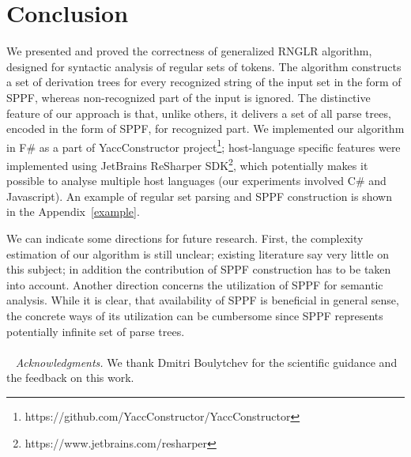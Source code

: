 \section{Conclusion}
%

We presented and proved the correctness of generalized RNGLR algorithm, designed for syntactic analysis of regular sets of
tokens. The algorithm constructs a set of derivation trees for every recognized string of the input set in the form of SPPF, 
whereas non-recognized part of the input is ignored. The distinctive feature of our approach is that, unlike others, it 
delivers a set of all parse trees, encoded in the form of SPPF, for recognized part. We implemented our algorithm in F\# as a part of YaccConstructor 
project\footnote{https://github.com/YaccConstructor/YaccConstructor}; host-language specific features were implemented
using JetBrains ReSharper SDK\footnote{https://www.jetbrains.com/resharper}, which potentially makes it possible to
analyse multiple host languages (our experiments involved C\# and Javascript). An example of regular set parsing and
SPPF construction is shown in the Appendix~\ref{example}.

We can indicate some directions for future research. First, the complexity estimation of our algorithm is still unclear; existing
literature say very little on this subject; in addition the contribution of SPPF construction has to be taken into account. 
Another direction concerns the utilization of SPPF for semantic analysis. While it is clear, that availability of SPPF 
is beneficial in general sense, the concrete ways of its utilization can be cumbersome since SPPF represents 
potentially infinite set of parse trees. 
~\\~\\~
\textit{Acknowledgments.} We thank Dmitri Boulytchev for the scientific guidance and 
the feedback on this work. 


